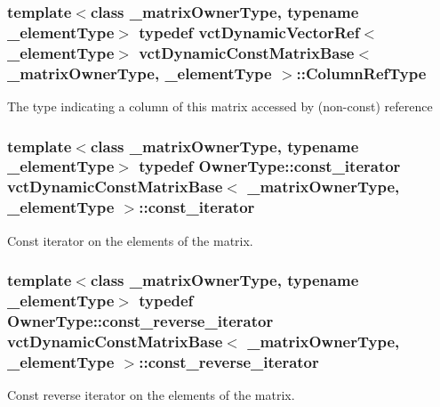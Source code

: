 \subsubsection[{Column\+Ref\+Type}]{\setlength{\rightskip}{0pt plus 5cm}template$<$class \+\_\+matrix\+Owner\+Type, typename \+\_\+element\+Type$>$ typedef {\bf vct\+Dynamic\+Vector\+Ref}$<$\+\_\+element\+Type$>$ {\bf vct\+Dynamic\+Const\+Matrix\+Base}$<$ \+\_\+matrix\+Owner\+Type, \+\_\+element\+Type $>$\+::{\bf Column\+Ref\+Type}}\label{classvct_dynamic_const_matrix_base_a232026578d12a51aa5228dee998b5663}
The type indicating a column of this matrix accessed by (non-\/const) reference \hypertarget{classvct_dynamic_const_matrix_base_a665b16a8ecd8b6febb4d193efa42205e}{}
\subsubsection[{const\+\_\+iterator}]{\setlength{\rightskip}{0pt plus 5cm}template$<$class \+\_\+matrix\+Owner\+Type, typename \+\_\+element\+Type$>$ typedef Owner\+Type\+::const\+\_\+iterator {\bf vct\+Dynamic\+Const\+Matrix\+Base}$<$ \+\_\+matrix\+Owner\+Type, \+\_\+element\+Type $>$\+::{\bf const\+\_\+iterator}}\label{classvct_dynamic_const_matrix_base_a665b16a8ecd8b6febb4d193efa42205e}
Const iterator on the elements of the matrix. \hypertarget{classvct_dynamic_const_matrix_base_afc30420e745eed5f1c838a01088ddc84}{}
\subsubsection[{const\+\_\+reverse\+\_\+iterator}]{\setlength{\rightskip}{0pt plus 5cm}template$<$class \+\_\+matrix\+Owner\+Type, typename \+\_\+element\+Type$>$ typedef Owner\+Type\+::const\+\_\+reverse\+\_\+iterator {\bf vct\+Dynamic\+Const\+Matrix\+Base}$<$ \+\_\+matrix\+Owner\+Type, \+\_\+element\+Type $>$\+::{\bf const\+\_\+reverse\+\_\+iterator}}\label{classvct_dynamic_const_matrix_base_afc30420e745eed5f1c838a01088ddc84}
Const reverse iterator on the elements of the matrix. \hypertarget{classvct_dynamic_const_matrix_base_ac8caf37f979246b1ae99d6e6876879e0}{}
